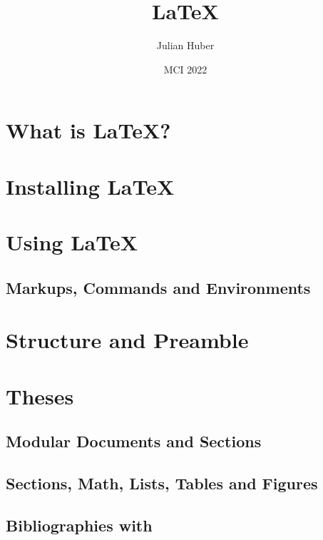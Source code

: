 \documentclass[xcolor=table]{beamer}
\author{Julian Huber}
\title{LaTeX}
\date{MCI 2022}
\begin{document}



\section{What is \LaTeX?}


\section{Installing \LaTeX}



\section{Using \LaTeX{}}
\subsection{Markups, Commands and Environments}


\section{Structure and Preamble}


\section{Theses}


\subsection{Modular Documents and Sections}

\subsection{Sections, Math, Lists, Tables and Figures}



\subsection{Bibliographies with \texorpdfstring{\BibTeX}{BibTeX}}




\end{document}
